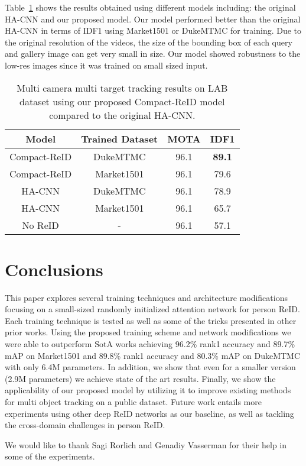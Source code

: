 \documentclass[sigconf]{acmart}
\begin{document}
Table~\ref{tab:tracking_benchmark_indoor} shows the results obtained using different models including: the original HA-CNN and our proposed model. Our model performed better than the original HA-CNN in terms of IDF1 using Market1501 or DukeMTMC for training. Due to the original resolution of the videos, the size of the bounding box of each query and gallery image can get very small in size. Our model showed robustness to the low-res images since it was trained on small sized input.

\begin{table}
\centering

\begin{tabular}{c|c|c|c}
Model       & Trained Dataset & MOTA & IDF1  \\
\hline\hline
Compact-ReID & DukeMTMC        &   96.1   &   \textbf{89.1}    \\
Compact-ReID & Market1501      &   96.1   &   79.6   \\
HA-CNN      & DukeMTMC        &   96.1   &   78.9   \\
HA-CNN      & Market1501      &   96.1   &   65.7   \\
No ReID     &    -            &   96.1   &   57.1
\end{tabular}
\medskip
\caption{Multi camera multi target tracking results on LAB dataset using our proposed Compact-ReID model compared to the original HA-CNN.}
\label{tab:tracking_benchmark_indoor}
\end{table}









\section{Conclusions}
This paper explores several training techniques and architecture modifications focusing on a small-sized randomly initialized attention network for person ReID. Each training technique is tested as well as some of the tricks presented in other prior works. Using the proposed training scheme and network modifications we were able to outperform SotA works achieving 96.2\% rank1 accuracy and 89.7\% mAP on Market1501 and 89.8\% rank1 accuracy and 80.3\% mAP on DukeMTMC with only 6.4M parameters. In addition, we show that even for a smaller version (2.9M parameters) we achieve state of the art results. Finally, we show the applicability of our proposed model by utilizing it to improve existing methods for multi object tracking on a public dataset.
Future work entails more experiments using other deep ReID networks as our baseline, as well as tackling the cross-domain challenges in person ReID.

\begin{acks}
We would like to thank Sagi Rorlich and Genadiy Vasserman for their help in some of the experiments.
\end{acks}


  \balance
  
\end{document}
